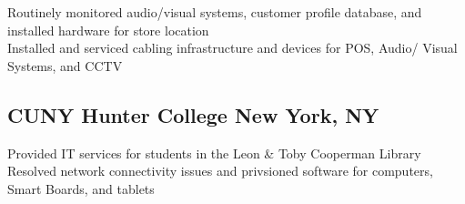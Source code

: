 \documentclass[a4paper]{Resume}
\begin{document}
\begin{onehalfspace}
\pt Routinely monitored audio/visual systems, customer profile database, and installed hardware for store location \\

\pt Installed and serviced cabling infrastructure and devices for POS, Audio/ Visual Systems, and CCTV \\

\sectionsep


\subsection{CUNY Hunter College \hfill \normalfont New York, NY}

\pt Provided IT services for students in the Leon & Toby Cooperman Library \\

\pt Resolved network connectivity issues and privsioned software for computers, Smart Boards, and tablets \\
\sectionsep

\end{onehalfspace}

\end{document}
